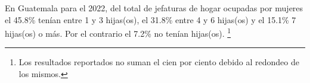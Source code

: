 En Guatemala para el 2022, del total de jefaturas de hogar ocupadas por mujeres el 45.8\% tenían entre 1 y 3 hijas(os), el 31.8\% entre 4 y 6 hijas(os) y el 15.1\% 7 hijas(os) o más. Por el contrario el 7.2\% no tenían hijas(os). \footnote{Los resultados reportados no suman el cien por ciento debido al redondeo de los mismos.}